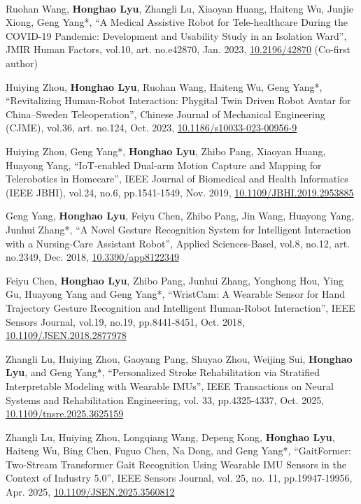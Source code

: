 \begin{enumerate}[align=left, widest={[\textbf{S.1}]}, itemindent=0em, label={\textbf{[\arabic*]}]
    \item[\textbf{[J.16]}] Ruohan Wang\textsuperscript{\dag}, \textbf{Honghao Lyu\textsuperscript{\dag}}, Zhangli Lu, Xiaoyan Huang, Haiteng Wu, Junjie Xiong, Geng Yang*, ``A Medical Assistive Robot for Tele-healthcare During the COVID-19 Pandemic: Development and Usability Study in an Isolation Ward'', JMIR Human Factors, vol.10, art. no.e42870, Jan. 2023, \href{http://doi.org/10.2196/42870}{10.2196/42870} (Co-first author)
    \item[\textbf{[J.15]}] Huiying Zhou, \textbf{Honghao Lyu}, Ruohan Wang, Haiteng Wu, Geng Yang*, ``Revitalizing Human-Robot Interaction: Phygital Twin Driven Robot Avatar for China--Sweden Teleoperation'', Chinese Journal of Mechanical Engineering (CJME), vol.36, art. no.124, Oct. 2023, \href{https://doi.org/10.1186/s10033-023-00956-9}{10.1186/s10033-023-00956-9}
    \item[\textbf{[J.14]}] Huiying Zhou, Geng Yang*, \textbf{Honghao Lyu}, Zhibo Pang, Xiaoyan Huang, Huayong Yang, ``IoT-enabled Dual-arm Motion Capture and Mapping for Telerobotics in Homecare'', IEEE Journal of Biomedical and Health Informatics (IEEE JBHI), vol.24, no.6, pp.1541-1549, Nov. 2019, \href{https://doi.org/10.1109/JBHI.2019.2953885}{10.1109/JBHI.2019.2953885}
    \item[\textbf{[J.13]}] Geng Yang, \textbf{Honghao Lyu}, Feiyu Chen, Zhibo Pang, Jin Wang, Huayong Yang, Junhui Zhang*, ``A Novel Gesture Recognition System for Intelligent Interaction with a Nursing-Care Assistant Robot'', Applied Sciences-Basel, vol.8, no.12, art. no.2349, Dec. 2018, \href{https://doi.org/10.3390/app8122349}{10.3390/app8122349}
    \item[\textbf{[J.12]}] Feiyu Chen, \textbf{Honghao Lyu}, Zhibo Pang, Junhui Zhang, Yonghong Hou, Ying Gu, Huayong Yang and Geng Yang*, ``WristCam: A Wearable Sensor for Hand Trajectory Gesture Recognition and Intelligent Human-Robot Interaction'', IEEE Sensors Journal, vol.19, no.19, pp.8441-8451, Oct. 2018, \href{https://doi.org/10.1109/JSEN.2018.2877978}{10.1109/JSEN.2018.2877978}
    \item[\textbf{[J.11]}] Zhangli Lu, Huiying Zhou, Gaoyang Pang, Shuyao Zhou, Weijing Sui, \textbf{Honghao Lyu}, and Geng Yang*, ``Personalized Stroke Rehabilitation via Stratified Interpretable Modeling with Wearable IMUs'', IEEE Transactions on Neural Systems and Rehabilitation Engineering, vol. 33, pp.4325-4337, Oct. 2025, \href{http://doi.org/10.1109/tnsre.2025.3625159}{10.1109/tnsre.2025.3625159}
    \item[\textbf{[J.10]}] Zhangli Lu, Huiying Zhou, Longqiang Wang, Depeng Kong, \textbf{Honghao Lyu}, Haiteng Wu, Bing Chen, Fuguo Chen, Na Dong, and Geng Yang*, ``GaitFormer: Two-Stream Transformer Gait Recognition Using Wearable IMU Sensors in the Context of Industry 5.0'', IEEE Sensors Journal, vol. 25, no. 11, pp.19947-19956, Apr. 2025, \href{http://doi.org/10.1109/JSEN.2025.3560812}{10.1109/JSEN.2025.3560812}

\end{enumerate}
